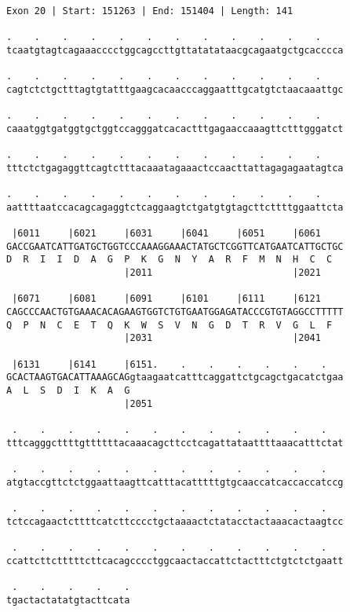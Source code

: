 \documentclass{article}
\begin{document}
\begin{Verbatim}
Exon 20 | Start: 151263 | End: 151404 | Length: 141
 
.    .    .    .    .    .    .    .    .    .    .    .    
tcaatgtagtcagaaacccctggcagccttgttatatataacgcagaatgctgcacccca
  
.    .    .    .    .    .    .    .    .    .    .    .    
cagtctctgctttagtgtatttgaagcacaacccaggaatttgcatgtctaacaaattgc
  
.    .    .    .    .    .    .    .    .    .    .    .    
caaatggtgatggtgctggtccagggatcacactttgagaaccaaagttctttgggatct
  
.    .    .    .    .    .    .    .    .    .    .    .    
tttctctgagaggttcagtctttacaaatagaaactccaacttattagagagaatagtca
  
.    .    .    .    .    .    .    .    .    .    .    .    
aattttaatccacagcagaggtctcaggaagtctgatgtgtagcttcttttggaattcta
  
 |6011     |6021     |6031     |6041     |6051     |6061    
GACCGAATCATTGATGCTGGTCCCAAAGGAAACTATGCTCGGTTCATGAATCATTGCTGC
D  R  I  I  D  A  G  P  K  G  N  Y  A  R  F  M  N  H  C  C  
                     |2011                         |2021    
  
 |6071     |6081     |6091     |6101     |6111     |6121    
CAGCCCAACTGTGAAACACAGAAGTGGTCTGTGAATGGAGATACCCGTGTAGGCCTTTTT
Q  P  N  C  E  T  Q  K  W  S  V  N  G  D  T  R  V  G  L  F  
                     |2031                         |2041    
  
 |6131     |6141     |6151.    .    .    .    .    .    .   
GCACTAAGTGACATTAAAGCAGgtaagaatcatttcaggattctgcagctgacatctgaa
A  L  S  D  I  K  A  G                                      
                     |2051                                  
  
 .    .    .    .    .    .    .    .    .    .    .    .   
tttcagggcttttgttttttacaaacagcttcctcagattataattttaaacatttctat
  
 .    .    .    .    .    .    .    .    .    .    .    .   
atgtaccgttctctggaattaagttcatttacatttttgtgcaaccatcaccaccatccg
  
 .    .    .    .    .    .    .    .    .    .    .    .   
tctccagaactcttttcatcttcccctgctaaaactctatacctactaaacactaagtcc
  
 .    .    .    .    .    .    .    .    .    .    .    .   
ccattcttctttttcttcacagcccctggcaactaccattctactttctgtctctgaatt
  
 .    .    .    .    .
tgactactatatgtacttcata
\end{Verbatim}
\newpage
\end{document}
